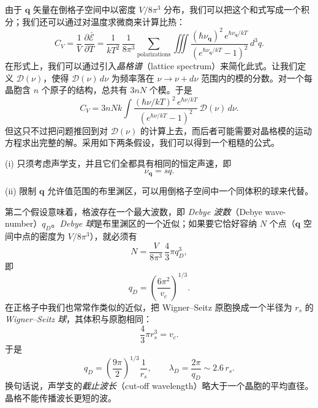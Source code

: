 由于 $\mathbf{q}$ 矢量在倒格子空间中以密度 $V/8\pi^3$ 分布，我们可以把这个和式写成一个积分；我们还可以通过对温度求微商来计算比热：
\begin{equation*}
C_V = \frac{1}{V}\,\frac{\partial\bar{\mathcal{E}}}{\partial T} = \frac{1}{kT^2}\,\frac{1}{8\pi^3}\sum_{\text{polarizations}} \iiint \frac{(\hbar\nu_{\mathbf{q}})^2\, e^{\hbar\nu_{\mathbf{q}}/kT}}{(e^{\hbar\nu_{\mathbf{q}}/kT}-1)^2}\, d^3q.
\tag{2.49}
\end{equation*}
在形式上，我们可以通过引入\emph{晶格谱}（lattice spectrum）来简化此式。让我们定义 $\mathcal{D}(\nu)$，使得 $\mathcal{D}(\nu)\,d\nu$ 为频率落在 $\nu\to\nu+d\nu$ 范围内的模的分数。对一个每晶胞含 $n$ 个原子的结构，总共有 $3nN$ 个模。于是
\begin{equation*}
C_V = 3nNk \int \frac{(\hbar\nu/kT)^2\, e^{\hbar\nu/kT}}{(e^{\hbar\nu/kT}-1)^2}\,\mathcal{D}(\nu)\, d\nu.
\tag{2.50}
\end{equation*}
但这只不过把问题推回到对 $\mathcal{D}(\nu)$ 的计算上去，而后者可能需要对晶格模的运动方程求出完整的解。采用如下两条假设，我们可以得到一个粗糙的公式。

(i) 只须考虑声学支，并且它们全都具有相同的恒定声速，即
\begin{equation*}
\nu_{\mathbf{q}} = sq.
\tag{2.51}
\end{equation*}

(ii) 限制 $\mathbf{q}$ 允许值范围的布里渊区，可以用倒格子空间中一个同体积的球来代替。

第二个假设意味着，格波存在一个最大波数，即 \emph{Debye 波数}（Debye wave-number）$q_D$。\emph{Debye 球}是布里渊区的一个近似；如果要它恰好容纳 $N$ 个点（$\mathbf{q}$ 空间中点的密度为 $V/8\pi^3$），就必须有
\begin{equation*}
N = \frac{V}{8\pi^3}\,\frac{4}{3}\pi q_D^3,
\tag{2.52}
\end{equation*}
即
\begin{equation*}
q_D = \left(\frac{6\pi^2}{v_c}\right)^{1/3}.
\tag{2.53}
\end{equation*}
在正格子中我们也常常作类似的近似，把 Wigner–Seitz 原胞换成一个半径为 $r_s$ 的 \emph{Wigner–Seitz 球}，其体积与原胞相同：
\begin{equation*}
\frac{4}{3}\pi r_s^3 = v_c.
\tag{2.54}
\end{equation*}
于是
\begin{equation*}
q_D = \left(\frac{9\pi}{2}\right)^{1/3}\frac{1}{r_s}, \qquad \lambda_D = \frac{2\pi}{q_D} \sim 2.6\, r_s.
\tag{2.55}
\end{equation*}
换句话说，声学支的\emph{截止波长}（cut-off wavelength）略大于一个晶胞的平均直径。晶格不能传播波长更短的波。

